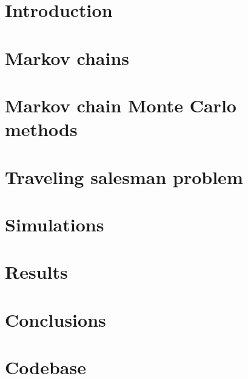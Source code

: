 




	
	\newpage
	
	
	\newpage
	
	\tableofcontents
	\listoftables
	\listoffigures
	\clearpage
	
	\section{Introduction}
		
	
	\section{Markov chains}
		
	
	\section{Markov chain Monte Carlo methods}
		
	
	\section{Traveling salesman problem}
		
	
	\section{Simulations}
		
	
	\section{Results}
		
	
	\section{Conclusions}
		
	
	\section{Codebase}
		
	
	\clearpage
	\nocite{*}
	
		
	
